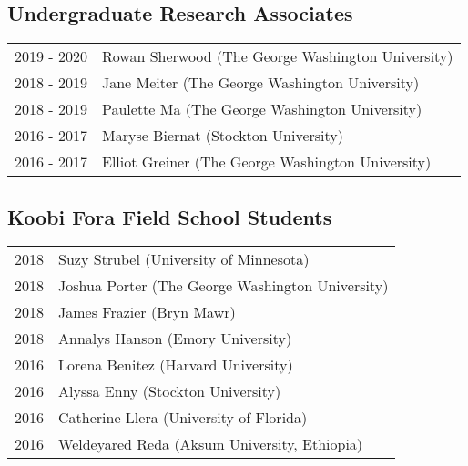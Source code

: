 \documentclass{article}
\begin{document}
\subsection*{Undergraduate Research Associates}
\begin{tabular}{p{}p{}}
2019 - 2020 & Rowan Sherwood (The George Washington University)\\[4pt]
2018 - 2019 & Jane Meiter (The George Washington University)\\[4pt]
2018 - 2019 & Paulette Ma (The George Washington University)\\[4pt]
2016 - 2017 & Maryse Biernat (Stockton University)\\[4pt]
2016 - 2017 & Elliot Greiner (The George Washington University)\\
\end{tabular} 

\subsection*{Koobi Fora Field School Students}
\begin{tabular}{p{}p{}}
2018 & Suzy Strubel (University of Minnesota)\\[4pt]
2018 & Joshua Porter (The George Washington University)\\[4pt]
2018 & James Frazier (Bryn Mawr)\\[4pt] 
2018 & Annalys Hanson (Emory University)\\[4pt]
2016 & Lorena Benitez (Harvard University)\\[4pt]
2016 & Alyssa Enny (Stockton University)\\[4pt]
2016 & Catherine Llera (University of Florida)\\[4pt]
2016 & Weldeyared Reda (Aksum University, Ethiopia)\\
\end{tabular}
 

 
\end{document}
